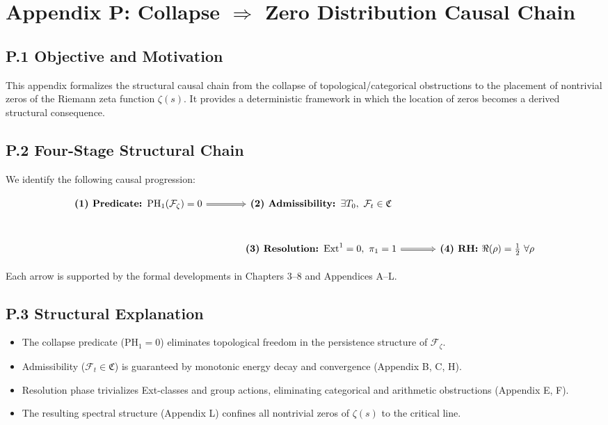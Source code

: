 \documentclass[11pt]{article}
\begin{document}
\appendix
\section*{Appendix P: Collapse $\Rightarrow$ Zero Distribution Causal Chain}

\subsection*{P.1 Objective and Motivation}

This appendix formalizes the structural causal chain from the collapse of topological/categorical obstructions to the placement of nontrivial zeros of the Riemann zeta function \( \zeta(s) \). It provides a deterministic framework in which the location of zeros becomes a derived structural consequence.

\subsection*{P.2 Four-Stage Structural Chain}

We identify the following causal progression:

\[
\begin{tikzcd}[row sep=large, column sep=large]
\textbf{(1) Predicate: } \mathrm{PH}_1(\mathcal{F}_{\zeta}) = 0
\arrow[r, Rightarrow] &
\textbf{(2) Admissibility: } \exists T_0,\ \mathcal{F}_t \in \mathfrak{C}
\\
\arrow[r, phantom, no head] &
\textbf{(3) Resolution: } \mathrm{Ext}^1 = 0,\ \pi_1 = 1
\arrow[r, Rightarrow] &
\textbf{(4) RH: } \Re(\rho) = \tfrac{1}{2}\ \forall \rho
\end{tikzcd}
\]

Each arrow is supported by the formal developments in Chapters 3–8 and Appendices A–L.

\subsection*{P.3 Structural Explanation}

\begin{itemize}
  \item The collapse predicate (\( \mathrm{PH}_1 = 0 \)) eliminates topological freedom in the persistence structure of \( \mathcal{F}_{\zeta} \).
  \item Admissibility (\( \mathcal{F}_t \in \mathfrak{C} \)) is guaranteed by monotonic energy decay and convergence (Appendix B, C, H).
  \item Resolution phase trivializes Ext-classes and group actions, eliminating categorical and arithmetic obstructions (Appendix E, F).
  \item The resulting spectral structure (Appendix L) confines all nontrivial zeros of \( \zeta(s) \) to the critical line.
\end{itemize}
\end{document}
